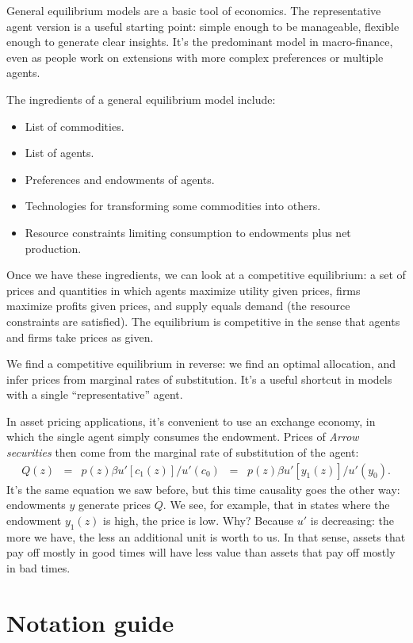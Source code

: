 \documentclass[11pt]{article}
\begin{document}
General equilibrium models are a basic tool of economics.
The representative agent version is a useful starting point:
simple enough to be manageable, flexible enough to generate clear insights.
It's the predominant model in macro-finance,
even as people work on extensions with more complex preferences
or multiple agents.

The ingredients of a general equilibrium model include:
\begin{itemize}
\item List of commodities.
\item List of agents.
\item Preferences and endowments of agents.
\item Technologies for transforming some commodities into others.
\item Resource constraints limiting consumption to endowments plus net production.
\end{itemize}
Once we have these ingredients, we can
look at a competitive equilibrium:
a set of prices and quantities in which
agents maximize utility given prices,
firms maximize profits given prices,
and supply equals demand (the resource constraints are satisfied).
The equilibrium is competitive in the sense that agents and firms
take prices as given.

We find a competitive equilibrium in reverse:
we find an optimal allocation, and infer prices from
marginal rates of substitution.
It's a useful shortcut in models with a single ``representative'' agent.

In asset pricing applications, it's convenient
to use an exchange economy, in which the single agent simply consumes
the endowment.
Prices of {\it Arrow securities\/} then come from the marginal rate of substitution
of the agent:
\begin{eqnarray*}
    Q(z) &=& p(z) \beta u'[c_1(z)]/u'(c_0) \;\;=\;\; p(z) \beta u'[y_1(z)]/u'(y_0) .
\end{eqnarray*}
It's the same equation we saw before, but this time causality goes the
other way:  endowments $y$ generate prices $Q$.
We see, for example, that in states where the endowment $y_1(z)$ is high,
the price is low.
Why?  Because $u'$ is decreasing:  the more we have, the less an additional
unit is worth to us.
In that sense, assets that pay off mostly in good times will have less value
than assets that pay off mostly in bad times.

\section*{Notation guide}
\end{document}
